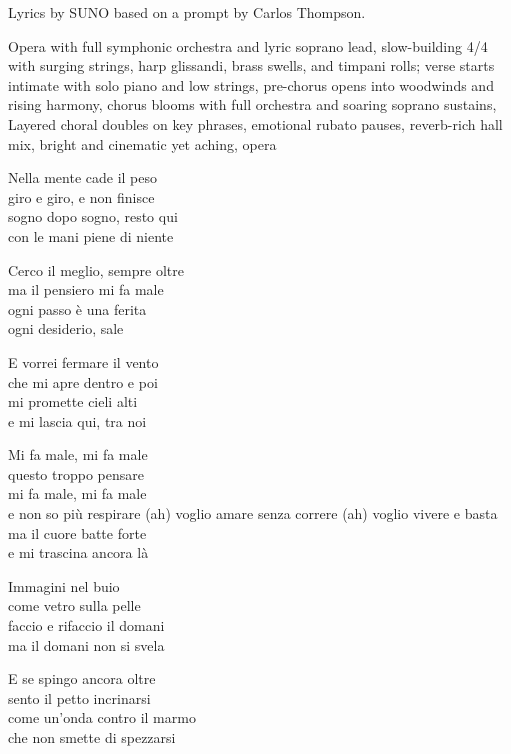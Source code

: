 
\begin{notes}
Lyrics by SUNO based on a prompt by Carlos Thompson.
\end{notes}
\begin{style}
Opera with full symphonic orchestra and lyric soprano lead, slow-building 4/4 with surging strings, harp glissandi, brass swells, and timpani rolls; verse starts intimate with solo piano and low strings, pre-chorus opens into woodwinds and rising harmony, chorus blooms with full orchestra and soaring soprano sustains, Layered choral doubles on key phrases, emotional rubato pauses, reverb-rich hall mix, bright and cinematic yet aching, opera
\end{style}
\begin{lyrics}
Nella mente cade il peso\\
giro e giro, e non finisce\\
sogno dopo sogno, resto qui\\
con le mani piene di niente

Cerco il meglio, sempre oltre\\
ma il pensiero mi fa male\\
ogni passo è una ferita\\
ogni desiderio, sale

E vorrei fermare il vento\\
che mi apre dentro e poi\\
mi promette cieli alti\\
e mi lascia qui, tra noi

Mi fa male, mi fa male\\
questo troppo pensare\\
mi fa male, mi fa male\\
e non so più respirare
(ah) voglio amare senza correre
(ah) voglio vivere e basta\\
ma il cuore batte forte\\
e mi trascina ancora là

Immagini nel buio\\
come vetro sulla pelle\\
faccio e rifaccio il domani\\
ma il domani non si svela

E se spingo ancora oltre\\
sento il petto incrinarsi\\
come un'onda contro il marmo\\
che non smette di spezzarsi


\end{lyrics}
